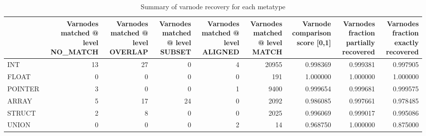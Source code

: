 \begin{table}
\centering
\caption{Summary of varnode recovery for each metatype}
\label{table:metatype-recovery-summary-with-levels}
\begin{tabular}{lrrrrrrrr}
\toprule
{} &  Varnodes matched @ level NO\_MATCH &  Varnodes matched @ level OVERLAP &  Varnodes matched @ level SUBSET &  Varnodes matched @ level ALIGNED &  Varnodes matched @ level MATCH &  Varnode comparison score [0,1] &  Varnodes fraction partially recovered &  Varnodes fraction exactly recovered \\
\midrule
INT     &                                 13 &                                27 &                                0 &                                 4 &                           20955 &                        0.998369 &                               0.999381 &                             0.997905 \\
FLOAT   &                                  0 &                                 0 &                                0 &                                 0 &                             191 &                        1.000000 &                               1.000000 &                             1.000000 \\
POINTER &                                  3 &                                 0 &                                0 &                                 1 &                            9400 &                        0.999654 &                               0.999681 &                             0.999575 \\
ARRAY   &                                  5 &                                17 &                               24 &                                 0 &                            2092 &                        0.986085 &                               0.997661 &                             0.978485 \\
STRUCT  &                                  2 &                                 8 &                                0 &                                 0 &                            2025 &                        0.996069 &                               0.999017 &                             0.995086 \\
UNION   &                                  0 &                                 0 &                                0 &                                 2 &                              14 &                        0.968750 &                               1.000000 &                             0.875000 \\
\bottomrule
\end{tabular}
\end{table}
